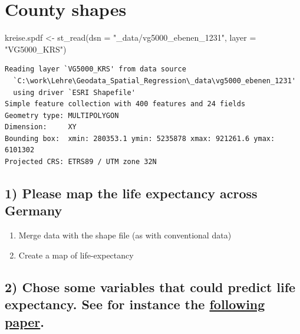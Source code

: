\documentclass[
  letterpaper,
  DIV=11,
  numbers=noendperiod]{scrreprt}
\newenvironment{Shaded}{\begin{snugshade}}{\end{snugshade}}
\newcommand{\AttributeTok}[1]{\textcolor[rgb]{0.40,0.45,0.13}{#1}}
\newcommand{\FunctionTok}[1]{\textcolor[rgb]{0.28,0.35,0.67}{#1}}
\newcommand{\NormalTok}[1]{\textcolor[rgb]{0.00,0.23,0.31}{#1}}
\newcommand{\OtherTok}[1]{\textcolor[rgb]{0.00,0.23,0.31}{#1}}
\newcommand{\StringTok}[1]{\textcolor[rgb]{0.13,0.47,0.30}{#1}}
\begin{document}
\hypertarget{county-shapes}{%
\section{County shapes}\label{county-shapes}}

\begin{Shaded}
\begin{Highlighting}[]
\NormalTok{kreise.spdf }\OtherTok{\textless{}{-}} \FunctionTok{st\_read}\NormalTok{(}\AttributeTok{dsn =} \StringTok{"\_data/vg5000\_ebenen\_1231"}\NormalTok{,}
                       \AttributeTok{layer =} \StringTok{"VG5000\_KRS"}\NormalTok{)}
\end{Highlighting}
\end{Shaded}

\begin{verbatim}
Reading layer `VG5000_KRS' from data source 
  `C:\work\Lehre\Geodata_Spatial_Regression\_data\vg5000_ebenen_1231' 
  using driver `ESRI Shapefile'
Simple feature collection with 400 features and 24 fields
Geometry type: MULTIPOLYGON
Dimension:     XY
Bounding box:  xmin: 280353.1 ymin: 5235878 xmax: 921261.6 ymax: 6101302
Projected CRS: ETRS89 / UTM zone 32N
\end{verbatim}

\hypertarget{please-map-the-life-expectancy-across-germany}{%
\subsection*{1) Please map the life expectancy across
Germany}\label{please-map-the-life-expectancy-across-germany}}

\begin{enumerate}
\def\labelenumi{\alph{enumi})}
\item
  Merge data with the shape file (as with conventional data)
\item
  Create a map of life-expectancy
\end{enumerate}

\hypertarget{chose-some-variables-that-could-predict-life-expectancy.-see-for-instance-the-following-paper.}{%
\subsection*{\texorpdfstring{2) Chose some variables that could predict
life expectancy. See for instance the
\href{https://doi.org/10.1073/pnas.2003719117}{following
paper}.}{2) Chose some variables that could predict life expectancy. See for instance the following paper.}}\label{chose-some-variables-that-could-predict-life-expectancy.-see-for-instance-the-following-paper.}}
\end{document}

